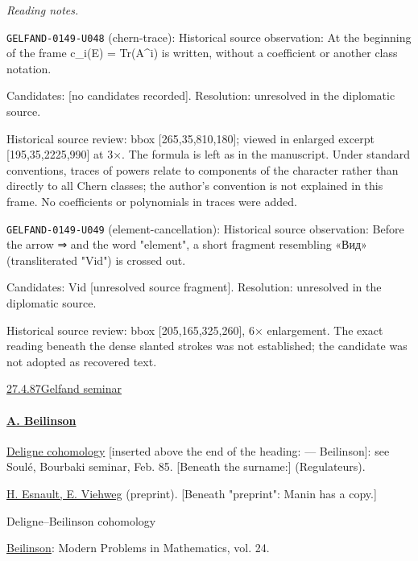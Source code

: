\par\smallskip\noindent\textit{Reading notes.}\par
\noindent\texttt{GELFAND-0149-U048} (chern-trace): Historical source observation: At the beginning of the frame c\_i(E) = Tr(A\textasciicircum{}i) is written, without a coefficient or another class notation.\par
Candidates: [no candidates recorded]. Resolution: unresolved in the diplomatic source.\par
Historical source review: bbox [265,35,810,180]; viewed in enlarged excerpt [195,35,2225,990] at 3×. The formula is left as in the manuscript. Under standard conventions, traces of powers relate to components of the character rather than directly to all Chern classes; the author’s convention is not explained in this frame. No coefficients or polynomials in traces were added.\par

\noindent\texttt{GELFAND-0149-U049} (element-cancellation): Historical source observation: Before the arrow ⇒ and the word "element", a short fragment resembling «Вид» (transliterated "Vid") is crossed out.\par
Candidates: Vid [unresolved source fragment]. Resolution: unresolved in the diplomatic source.\par
Historical source review: bbox [205,165,325,260], 6× enlargement. The exact reading beneath the dense slanted strokes was not established; the candidate was not adopted as recovered text.\par



\underline{27.4.87}\qquad \underline{Gelfand seminar}

\paragraph*{\underline{A. Beilinson}}
\underline{Deligne cohomology} [inserted above the end of the heading: --- Beilinson]:
see  Soulé,
Bourbaki seminar, Feb. 85.
[Beneath the surname:] (Regulateurs).

\underline{H. Esnault, E. Viehweg} (preprint).
[Beneath "preprint": Manin has a copy.]

Deligne--Beilinson cohomology

\underline{Beilinson}: Modern Problems in Mathematics, vol. 24.

